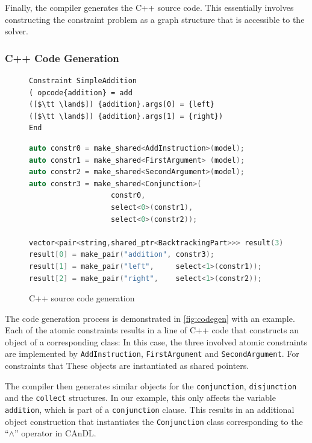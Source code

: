    Finally, the compiler generates the C++ source code.
    This essentially involves constructing the constraint problem as a graph
    structure that is accessible to the solver.

\subsubsection{C++ Code Generation}

\begin{figure}[t]
\centering
\begin{lstlisting}[language=CAnDL]
Constraint SimpleAddition
( opcode{addition} = add
([$\tt \land$]) {addition}.args[0] = {left}
([$\tt \land$]) {addition}.args[1] = {right})
End
\end{lstlisting}
\begin{lstlisting}[language=C++]
auto constr0 = make_shared<AddInstruction>(model);
auto constr1 = make_shared<FirstArgument> (model);
auto constr2 = make_shared<SecondArgument>(model);
auto constr3 = make_shared<Conjunction>(
                   constr0,
                   select<0>(constr1),
                   select<0>(constr2));

vector<pair<string,shared_ptr<BacktrackingPart>>> result(3);
result[0] = make_pair("addition", constr3);
result[1] = make_pair("left",     select<1>(constr1));
result[2] = make_pair("right",    select<1>(constr2));
\end{lstlisting}
\vspace{-0.3cm}
\caption{C++ source code generation}
\label{fig:codegen}
\end{figure}

    The code generation process is demonstrated in \autoref{fig:codegen} with an
    example.
    Each of the atomic constraints results in a line of C++ code that constructs
    an object of a corresponding class:
    In this case, the three involved atomic constraints are implemented by
    \texttt{AddInstruction}, \texttt{FirstArgument} and \texttt{SecondArgument}.
    For constraints that 
    These objects are instantiated as shared pointers.

    The compiler then generates similar objects for the
    \texttt{conjunction}, \texttt{disjunction} and the \texttt{collect} structures.
    In our example, this only affects the variable \texttt{addition}, which is
    part of a \texttt{conjunction} clause.
    This results in an additional object construction that instantiates the
    \texttt{Conjunction} class corresponding to the ``$\land$'' operator
    in CAnDL.

